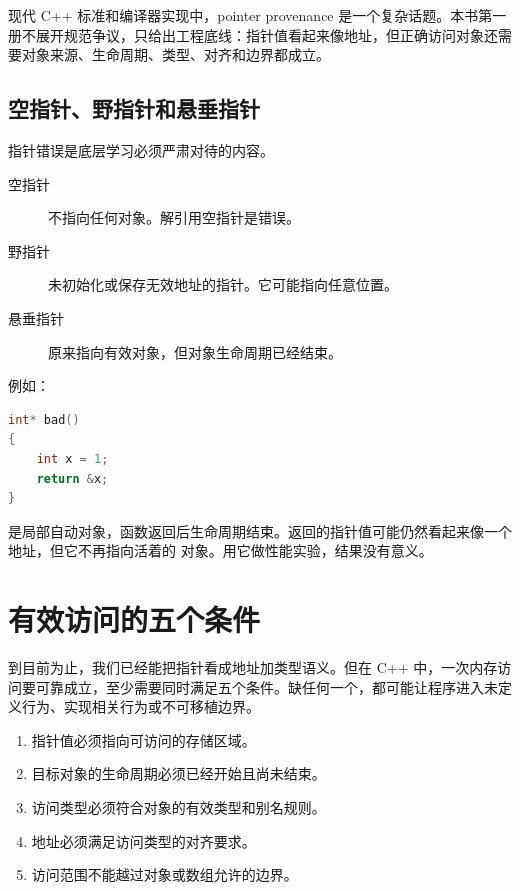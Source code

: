 \begin{deepdive}
现代 C++ 标准和编译器实现中，pointer provenance 是一个复杂话题。本书第一册不展开规范争议，只给出工程底线：指针值看起来像地址，但正确访问对象还需要对象来源、生命周期、类型、对齐和边界都成立。
\end{deepdive}

\subsection{空指针、野指针和悬垂指针}

指针错误是底层学习必须严肃对待的内容。

\begin{description}
  \item[空指针] 不指向任何对象。解引用空指针是错误。
  \item[野指针] 未初始化或保存无效地址的指针。它可能指向任意位置。
  \item[悬垂指针] 原来指向有效对象，但对象生命周期已经结束。
\end{description}

例如：

\begin{lstlisting}[language=C++]
int* bad()
{
    int x = 1;
    return &x;
}
\end{lstlisting}

 是局部自动对象，函数返回后生命周期结束。返回的指针值可能仍然看起来像一个地址，但它不再指向活着的  对象。用它做性能实验，结果没有意义。

\section{有效访问的五个条件}

到目前为止，我们已经能把指针看成地址加类型语义。但在 C++ 中，一次内存访问要可靠成立，至少需要同时满足五个条件。缺任何一个，都可能让程序进入未定义行为、实现相关行为或不可移植边界。

\begin{enumerate}
  \item 指针值必须指向可访问的存储区域。
  \item 目标对象的生命周期必须已经开始且尚未结束。
  \item 访问类型必须符合对象的有效类型和别名规则。
  \item 地址必须满足访问类型的对齐要求。
  \item 访问范围不能越过对象或数组允许的边界。
\end{enumerate}

